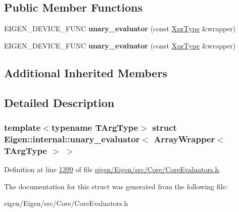 \subsection*{Public Member Functions}
\begin{DoxyCompactItemize}
\item 
\mbox{\label{struct_eigen_1_1internal_1_1unary__evaluator_3_01_array_wrapper_3_01_t_arg_type_01_4_01_4_a2fc5a18e251618aa6b136c7062876473}} 
E\+I\+G\+E\+N\+\_\+\+D\+E\+V\+I\+C\+E\+\_\+\+F\+U\+NC {\bfseries unary\+\_\+evaluator} (const \hyperlink{group___core___module_class_eigen_1_1_array_wrapper}{Xpr\+Type} \&wrapper)
\item 
\mbox{\label{struct_eigen_1_1internal_1_1unary__evaluator_3_01_array_wrapper_3_01_t_arg_type_01_4_01_4_a2fc5a18e251618aa6b136c7062876473}} 
E\+I\+G\+E\+N\+\_\+\+D\+E\+V\+I\+C\+E\+\_\+\+F\+U\+NC {\bfseries unary\+\_\+evaluator} (const \hyperlink{group___core___module_class_eigen_1_1_array_wrapper}{Xpr\+Type} \&wrapper)
\end{DoxyCompactItemize}
\subsection*{Additional Inherited Members}


\subsection{Detailed Description}
\subsubsection*{template$<$typename T\+Arg\+Type$>$\newline
struct Eigen\+::internal\+::unary\+\_\+evaluator$<$ Array\+Wrapper$<$ T\+Arg\+Type $>$ $>$}



Definition at line \hyperlink{eigen_2_eigen_2src_2_core_2_core_evaluators_8h_source_l01399}{1399} of file \hyperlink{eigen_2_eigen_2src_2_core_2_core_evaluators_8h_source}{eigen/\+Eigen/src/\+Core/\+Core\+Evaluators.\+h}.



The documentation for this struct was generated from the following file\+:\begin{DoxyCompactItemize}
\item 
eigen/\+Eigen/src/\+Core/\+Core\+Evaluators.\+h\end{DoxyCompactItemize}
